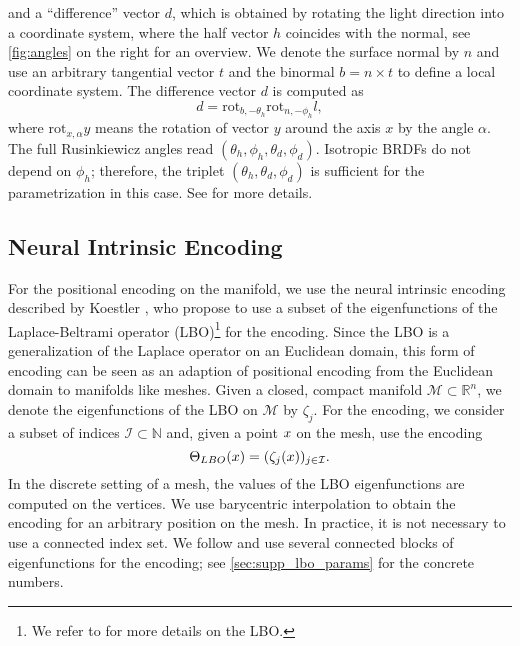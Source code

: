 and a ``difference'' vector $d$, which is obtained by rotating the light direction into a coordinate system, where the half vector $h$ coincides with the normal, see \cref{fig:angles} on the right for an overview. We denote the surface normal by $n$ and use an arbitrary tangential vector $t$ and the binormal $b=n\times t$ to define a local coordinate system. The difference vector $d$ is computed as 
\begin{equation}
    d=\mathrm{rot}_{b,-\theta_h}\mathrm{rot}_{n, -\phi_h}l,
\end{equation}
where $\mathrm{rot}_{x, \alpha}y$ means the rotation of vector $y$ around the axis $x$ by the angle $\alpha$. The full Rusinkiewicz angles read $(\theta_h, \phi_h, \theta_d, \phi_d)$. Isotropic BRDFs do not depend on $\phi_h$; therefore, the triplet $(\theta_h, \theta_d, \phi_d)$ is sufficient for the parametrization in this case. See \cite{rusinkiewicz1998new} for more details.

\subsection{Neural Intrinsic Encoding}
\label{sec:supp:intrinsic_neural_encoding}

For the positional encoding on the manifold, we use the neural intrinsic encoding described by Koestler \etal \cite{KoestlerIntrinsicNeuralFields22}, who propose to use a subset of the eigenfunctions of the  Laplace-Beltrami operator (LBO)\footnote{We refer to \cite{Rustamov07Laplace-BeltramiEigenfunctions} for more details on the LBO.} for the encoding. Since the LBO is a generalization of the Laplace operator on an Euclidean domain, this form of encoding can be seen as an adaption of positional encoding from the Euclidean domain to manifolds like meshes. Given a closed, compact manifold $\mathcal{M}\subset\mathbb{R}^n$, we denote the eigenfunctions of the LBO on $\mathcal{M}$ by $\zeta_j$. For the encoding, we consider a subset of indices $\mathcal{I}\subset \mathbb{N}$ and, given a point $x$ on the mesh, use the encoding
\begin{equation}
    \Theta_{LBO}(x) = (\zeta_j(x))_{j\in\mathcal{I}}.
\end{equation}
In the discrete setting of a mesh, the values of the LBO eigenfunctions are computed on the vertices. We use barycentric interpolation to obtain the encoding for an arbitrary position on the mesh.
In practice, it is not necessary to use a connected index set. We follow \cite{KoestlerIntrinsicNeuralFields22} and use several connected blocks of eigenfunctions for the encoding; see \cref{sec:supp_lbo_params} for the concrete numbers.

